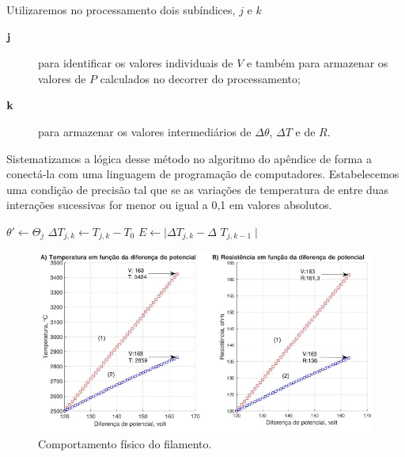 \documentclass[12pt]{article}
\begin{document}
Utilizaremos no processamento dois subíndices, $j$ e $k$
\begin{description}

    \item [$\bf j$] \hspace{0.57cm} para identificar os valores individuais de $V$ e também para armazenar os valores de $P$ calculados no decorrer do processamento;
    \item  [$\bf k$] \hspace{0.5cm} para armazenar os valores intermediários de $\Delta \theta$, $\Delta T$ e de $R$.
    \hspace{-0.5cm}
\end{description}
Sistematizamos a lógica desse método no algoritmo do apêndice de forma a conectá-la com uma linguagem de programação de computadores. 
Estabelecemos uma condição de precisão tal que se as variações de temperatura de entre duas interações sucessivas for menor ou igual a 0,1 em valores absolutos.

 $\theta'\longleftarrow\Theta_j$
 $\Delta T_{j,k} \longleftarrow T_{j,k}-T_0$
 $E\longleftarrow \mid\Delta T_{j,k}-\Delta$
 $T_{j,k-1}\mid$
\newpage
\begin{center}
\begin{figure}[h]
\includegraphics[scale=.99]{img-livro012018latex.jpg}
\caption{Comportamento físico do filamento.}
\label{fig:plot}
\end{figure}
\end{center}
\end{document}
